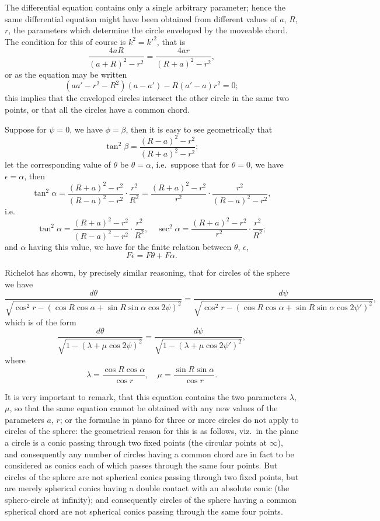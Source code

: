 \documentclass[11pt,a4paper]{article}
\theoremstyle{plain}
\begin{document}
The differential equation contains only a single arbitrary parameter; hence the same differential equation might have been obtained from different values of $a$, $R$, $r$, the parameters which determine the circle enveloped by the moveable chord. The condition for this of course is $k^2 = k'^2$, that is
\[
\frac{4aR}{(a+R)^2-r^2} = \frac{4ar}{(R+a)^2-r^2},
\]
or as the equation may be written
\[
(aa' - r^2 - R^2)(a - a') - R(a' - a)r^2 = 0;
\]
this implies that the enveloped circles intersect the other circle in the same two points, or that all the circles have a common chord.
\newpage

Suppose for $\psi = 0$, we have $\phi = \beta$, then it is easy to see geometrically that
\[
\tan^2\beta = \frac{(R-a)^2-r^2}{(R+a)^2-r^2};
\]
let the corresponding value of $\theta$ be $\theta = \alpha$, i.e.\ suppose that for $\theta = 0$, we have $\epsilon = \alpha$, then
\[
\tan^2\alpha = \frac{(R+a)^2-r^2}{(R-a)^2-r^2} \cdot \frac{r^2}{R^2} = \frac{(R+a)^2-r^2}{r^2} \cdot \frac{r^2}{(R-a)^2-r^2},
\]
i.e.
\[
\tan^2\alpha = \frac{(R+a)^2-r^2}{(R-a)^2-r^2} \cdot \frac{r^2}{R^2}, \quad \sec^2\alpha = \frac{(R+a)^2-r^2}{r^2} \cdot \frac{r^2}{R^2};
\]
and $\alpha$ having this value, we have for the finite relation between $\theta$, $\epsilon$,
\[
F\epsilon = F\theta + F\alpha.
\]

Richelot has shown, by precisely similar reasoning, that for circles of the sphere we have
\[
\frac{d\theta}{\sqrt{\cos^2 r - (\cos R \cos\alpha + \sin R \sin\alpha \cos 2\psi)^2}} = \frac{d\psi}{\sqrt{\cos^2 r - (\cos R \cos\alpha + \sin R \sin\alpha \cos 2\psi')^2}},
\]
which is of the form
\[
\frac{d\theta}{\sqrt{1-(\lambda + \mu\cos 2\psi)^2}} = \frac{d\psi}{\sqrt{1-(\lambda + \mu\cos 2\psi')^2}},
\]
where
\[
\lambda = \frac{\cos R \cos\alpha}{\cos r}, \quad \mu = \frac{\sin R \sin\alpha}{\cos r}.
\]

It is very important to remark, that this equation contains the two parameters $\lambda$, $\mu$, so that the same equation cannot be obtained with any new values of the parameters $a$, $r$; or the formulae in piano for three or more circles do not apply to circles of the sphere: the geometrical reason for this is as follows, viz.\ in the plane a circle is a conic passing through two fixed points (the circular points at $\infty$), and consequently any number of circles having a common chord are in fact to be considered as conics each of which passes through the same four points. But circles of the sphere are not spherical conics passing through two fixed points, but are merely spherical conics having a double contact with an absolute conic (the sphero-circle at infinity); and consequently circles of the sphere having a common spherical chord are not spherical conics passing through the same four points.
\end{document}
